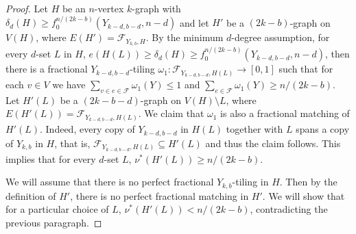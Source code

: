 \documentclass[11pt, reqno]{amsart}    	%
\theoremstyle{definition}
\numberwithin{equation}{section}
\begin{document}
	\begin{proof}
		Let $H$ be an $n$-vertex $k$-graph with $\delta_d(H) \ge f_0^{n/(2k-b)}(Y_{k-d, b-d}, n-d)$ and
		let $H'$ be a $(2k-b)$-graph on $V(H)$, where $E(H') = \mathcal F_{Y_{k, b},H}$.
		By the minimum $d$-degree assumption, for every $d$-set $L$ in $H$, $e(H(L)) \ge \delta_d(H)\ge f_0^{n/(2k-b)}(Y_{k-d, b-d}, n-d)$, 
		then there is a fractional $Y_{k-d, b-d}$-tiling $\omega_1: \mathcal F_{Y_{k-d, b-d}, H(L)} \to [0,1]$ such that for each $v\in V$ we have $\sum_{v\in e\in \mathcal F} \omega_1(Y) \le 1$ and $\sum_{e\in \mathcal F} \omega_1(Y) \ge n/(2k-b)$. Let $H'(L)$ be a $(2k-b-d)$-graph on $V(H)\setminus L$, where $E(H'(L)) = \mathcal F_{Y_{k-d, b-d}, H(L)}$.
		We claim that $\omega_1$ is also a fractional matching of $H'(L)$.
		Indeed, every copy of $Y_{k-d, b-d}$ in $H(L)$ together with $L$ spans a copy of $Y_{k,b}$ in $H$, that is, $\mathcal F_{Y_{k-d, b-d}, H(L)} \subseteq H'(L)$ and thus the claim follows.
		This implies that for every $d$-set $L$, $\nu^*(H'(L))\ge n/(2k-b)$.
		
		We will assume that there is no perfect fractional $Y_{k, b}$-tiling in $H$.
		Then by the definition of $H'$, there is no perfect fractional matching in $H'$.
		We will show that for a particular choice of $L$, $\nu^*(H'(L))<n/(2k-b)$, contradicting the previous paragraph.
		

\end{proof}
\end{document}
